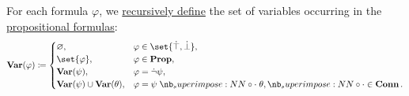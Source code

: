 \begin{definition}\label{def:propositional_syntax/formula_variables}\mimprovised
  For each formula \( \varphi \), we \hyperref[con:evaluation]{recursively define} the set of variables occurring in the \hyperref[def:propositional_syntax/formula]{propositional formulas}:
  \begin{equation*}
    \op*{Var}(\varphi) \coloneqq \begin{cases}
      \varnothing,                            &\varphi \in \set{ \syntop, \synbot }, \\
      \set{ \varphi },                        &\varphi \in \op*{Prop}, \\
      \op*{Var}(\psi),                        &\varphi = \synneg \psi, \\
      \op*{Var}(\psi) \cup \op*{Var}(\theta), &\varphi = \psi \syncirc \theta, {\syncirc} \in \op*{Conn}.
    \end{cases}
  \end{equation*}
\end{definition}

